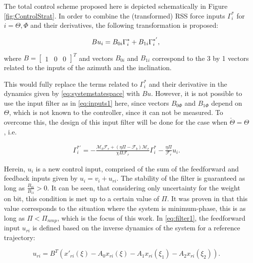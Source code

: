 \documentclass[main.tex]{subfiles}
\begin{document}
		
	The total control scheme proposed here is depicted schematically in Figure \ref{fig:ControlStrat}. In order to combine the (transformed) RSS force inputs $\Gamma_i^*$ for $i = \Theta, \Phi$ and their derivatives, the following transformation is proposed:
	
	\begin{equation}
		B u_i = B_{0i}\Gamma_i^* + B_{1i}\Gamma_i^{*'}, 	\label{eq:inputs1}\\
	\end{equation}
	
	where $B = \begin{bmatrix} 1 & 0 & 0\end{bmatrix}^T$ and vectors $B_{0i}$ and $B_{1i}$ correspond to the 3 by 1 vectors related to the inputs of the azimuth and the inclination.
	
	This would fully replace the terms related to $\Gamma_i^*$ and their derivative in the dynamics given by \eqref{eq:systemstatespace} with $Bu$. However, it is not possible to use the input filter as in \eqref{eq:inputs1} here, since vectors $B_{0\Phi}$ and $B_{1\Phi}$ depend on $\Theta$, which is not known to the controller, since it can not be measured. To overcome this, the design of this input filter will be done for the case when $\check{\Theta} = \Theta$, i.e.
	
	\begin{align}
	\Gamma_{i}^{*'} = -\frac{\mathcal{M}_b \mathcal{F}_r + (\eta \Pi - \mathcal{F}_b)\mathcal{M}_r}{\chi \Pi \mathcal{F}_r}\Gamma_{i}^{*} - \frac{\eta \Pi}{\mathcal{F}_r}u_i. \label{eq:filter1} 	
	\end{align}	
	
	Herein, $u_i$ is a new control input, comprised of the sum of the feedforward and feedback inputs given by $u_i = v_i + u_{ri}$. The stability of the filter is guaranteed as long as $\frac{B_{0i}}{B_{1i}} > 0$. It can be seen, that considering only uncertainty for the weight on bit, this condition is met up to a certain value of $\Pi$. It was proven in \cite{Kremers2013} that this value corresponds to the situation where the system is minimum-phase, this is as long as $\Pi < \Pi_{nmp}$, which is the focus of this work. In \eqref{eq:filter1}, the feedforward input $u_{ri}$ is defined based on the inverse dynamics of the system for a reference trajectory:
	
	\begin{equation}
	u_{ri} = B^T (x'_{ri}(\xi) - A_0 x_{ri}(\xi) - A_1 x_{ri}(\xi_1) - A_2 x_{ri}(\xi_2)).
	\label{eq:feedforward}
	\end{equation}
	
\end{document}
